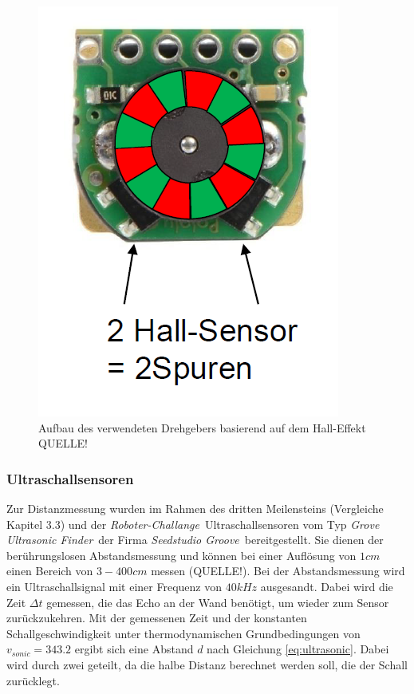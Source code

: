 \documentclass[12pt,a4paper,oneside]{article}
\begin{document}
\begin{spacing}{1.15}
\begin{figure}[!htb]
	\centering
	\includegraphics[scale=.3]{figs/encoder}
	\caption{Aufbau des verwendeten Drehgebers basierend auf dem Hall-Effekt QUELLE!}
	\label{fig:encoder}
\end{figure}

\subsubsection{Ultraschallsensoren}

Zur Distanzmessung wurden im Rahmen des dritten Meilensteins (Vergleiche Kapitel 3.3) und der \glqq \textit{Roboter-Challange}\grqq \ Ultraschallsensoren vom Typ \glqq \textit{Grove Ultrasonic Finder}\grqq \  der Firma \glqq \textit{Seedstudio Groove}\grqq \  bereitgestellt. Sie dienen der berührungslosen Abstandsmessung und können bei einer Auflösung von $1 cm$ einen Bereich von $3 - 400 cm$ messen (QUELLE!). Bei der Abstandsmessung wird ein Ultraschallsignal mit einer Frequenz von $40 kHz$ ausgesandt. Dabei wird die Zeit $\Delta t$ gemessen, die das Echo an der Wand benötigt, um wieder zum Sensor zurückzukehren. Mit der gemessenen Zeit und der konstanten Schallgeschwindigkeit unter thermodynamischen Grundbedingungen von $v_{sonic} = 343.2$ ergibt sich eine Abstand $d$ nach Gleichung \ref{eq:ultrasonic}. Dabei wird durch zwei geteilt, da die halbe Distanz berechnet werden soll, die der Schall zurücklegt.


\end{spacing}
\end{document}
